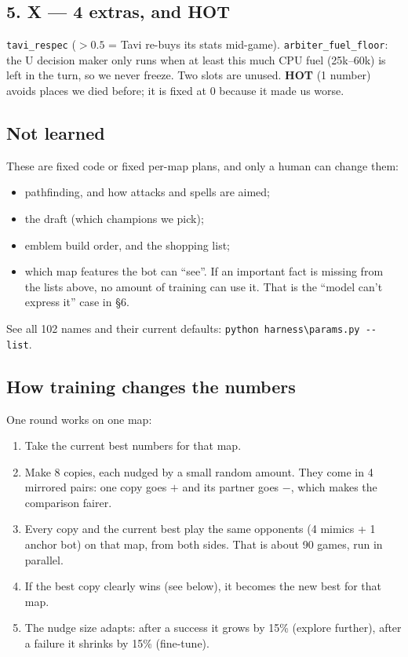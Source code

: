 \documentclass[11pt,a4paper]{article}
\newcommand{\f}[1]{\texttt{#1}}
\begin{document}
\subsection*{5. X --- 4 extras, and HOT}
\f{tavi\_respec} ($>0.5$ = Tavi re-buys its stats mid-game). \f{arbiter\_fuel\_floor}: the U decision
maker only runs when at least this much CPU fuel (25k--60k) is left in the turn, so we never freeze.
Two slots are unused. \textbf{HOT} (1 number) avoids places we died before; it is fixed at 0
because it made us worse.

\subsection*{Not learned}
These are fixed code or fixed per-map plans, and only a human can change them:
\begin{itemize}
\item pathfinding, and how attacks and spells are aimed;
\item the draft (which champions we pick);
\item emblem build order, and the shopping list;
\item which map features the bot can ``see''. If an important fact is missing from the lists above,
  no amount of training can use it. That is the ``model can't express it'' case in \S6.
\end{itemize}
See all 102 names and their current defaults: \f{python harness\textbackslash params.py -{}-list}.

\subsection*{How training changes the numbers}
One round works on one map:
\begin{enumerate}
\item Take the current best numbers for that map.
\item Make 8 copies, each nudged by a small random amount. They come in 4 mirrored pairs: one copy
  goes $+$ and its partner goes $-$, which makes the comparison fairer.
\item Every copy and the current best play the same opponents (4 mimics + 1 anchor bot) on that map,
  from both sides. That is about 90 games, run in parallel.
\item If the best copy clearly wins (see below), it becomes the new best for that map.
\item The nudge size adapts: after a success it grows by 15\% (explore further), after a failure it
  shrinks by 15\% (fine-tune).
\end{enumerate}
\end{document}
